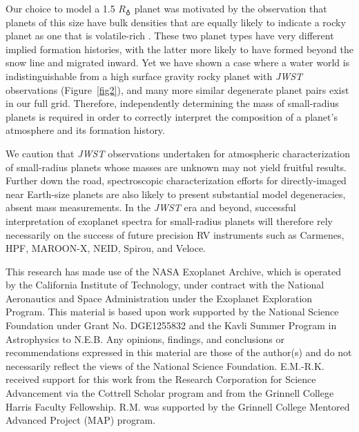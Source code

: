 \documentclass[iop]{emulateapj}
\begin{document}
Our choice to model a 1.5 $R_{\earth}$ planet was motivated by the observation that planets of this size have bulk densities that are equally likely to indicate a rocky planet as one that is volatile-rich \citep{lop14,rog15}.  These two planet types have very different implied formation histories, with the latter more likely to have formed beyond the snow line and migrated inward.  Yet we have shown a case where a water world is indistinguishable from a high surface gravity rocky planet with \emph{JWST} observations (Figure~\ref{fig2}), and many more similar degenerate planet pairs exist in our full grid.  Therefore, independently determining the mass of small-radius planets is required in order to correctly interpret the composition of a planet's atmosphere and its formation history.

We caution that \emph{JWST} observations undertaken for atmospheric characterization of small-radius planets whose masses are unknown may not yield fruitful results.  Further down the road, spectroscopic characterization efforts for directly-imaged near Earth-size planets are also likely to present substantial model degeneracies, absent mass measurements.  In the \emph{JWST} era and beyond, successful interpretation of exoplanet spectra for small-radius planets will therefore rely necessarily on the success of future precision RV instruments such as Carmenes, HPF, MAROON-X, NEID, Spirou, and Veloce.


\acknowledgments
This research has made use of the NASA Exoplanet Archive, which is operated by the California Institute of Technology, under contract with the National Aeronautics and Space Administration under the Exoplanet Exploration Program. This material is based upon work supported by the National Science Foundation under Grant No. DGE1255832 and the Kavli Summer Program in Astrophysics to N.E.B. Any opinions, findings, and conclusions or recommendations expressed in this material are those of the author(s) and do not necessarily reflect the views of the National Science Foundation.  E.M.-R.K. received support for this work from the Research Corporation for Science Advancement via the Cottrell Scholar program and from the Grinnell College Harris Faculty Fellowship.  R.M. was supported by the Grinnell College Mentored Advanced Project (MAP) program.
\end{document}
